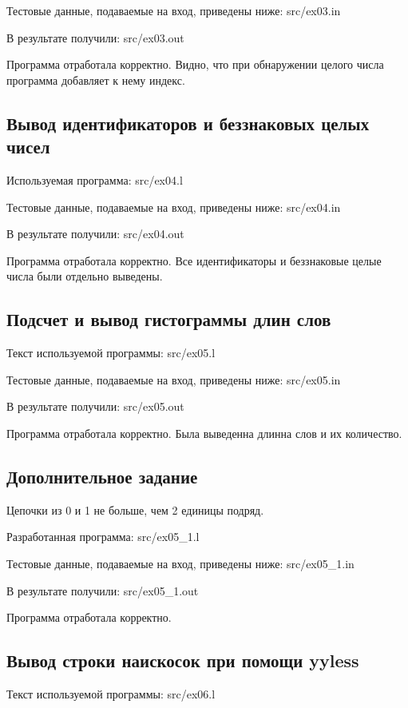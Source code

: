 Тестовые данные, подаваемые на вход, приведены ниже:
 {src/ex03.in}

В результате получили:
 {src/ex03.out}

Программа отработала корректно. Видно, что при обнаружении целого числа программа добавляет к нему индекс.

\subsection{Вывод идентификаторов и беззнаковых целых чисел}
Используемая программа:
 {src/ex04.l}

Тестовые данные, подаваемые на вход, приведены ниже:
 {src/ex04.in}

В результате получили:
 {src/ex04.out}

Программа отработала корректно. Все идентификаторы и беззнаковые целые числа были отдельно выведены.

\subsection{Подсчет и вывод гистограммы длин слов}
Текст используемой программы:
 {src/ex05.l}

Тестовые данные, подаваемые на вход, приведены ниже:
 {src/ex05.in}

В результате получили:
 {src/ex05.out}

Программа отработала корректно. Была выведенна длинна слов и их количество.

\subsection{Дополнительное задание}
Цепочки из 0 и 1 не больше, чем 2 единицы подряд.

Разработанная программа:
 {src/ex05_1.l}

Тестовые данные, подаваемые на вход, приведены ниже:
 {src/ex05_1.in}

В результате получили:
 {src/ex05_1.out}

Программа отработала корректно.

\subsection{Вывод строки наискосок при помощи yyless}
Текст используемой программы:
 {src/ex06.l}

